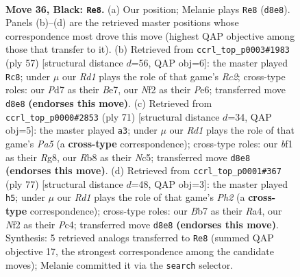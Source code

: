 \documentclass[11pt]{article}
\begin{document}
\clearpage

\begin{figure}[p]\centering
\begin{subfigure}{0.46\textwidth}\centering
\resizebox{\linewidth}{!}{%
\newchessgame
\chessboard[
  setfen={1r1r4/pb1p1pk1/8/4R1P1/8/8/PPK2n2/2B2BR1 b - - 0 36},
  showmover=false,
  pgfstyle=straightmove, color=movearrow, markmove={d8-e8}
]}
\caption{}
\end{subfigure}\hfill
\begin{subfigure}{0.46\textwidth}\centering
\resizebox{\linewidth}{!}{%
\newchessgame
\chessboard[
  setfen={8/r1r1bpk1/4p3/p4p2/P7/1R1BPP2/5PKP/3R4 b - - 1 29},
  showmover=false,
  pgfstyle=straightmove, color=movearrow, markmove={c7-c8}
]}
\caption{}
\end{subfigure}
\\[4pt]
\begin{subfigure}{0.46\textwidth}\centering
\resizebox{\linewidth}{!}{%
\newchessgame
\chessboard[
  setfen={6r1/2k2pr1/1p6/2n1P3/p1P2P1R/8/5KP1/4RB2 b - - 5 36},
  showmover=false,
  pgfstyle=straightmove, color=movearrow, markmove={a4-a3}
]}
\caption{}
\end{subfigure}\hfill
\begin{subfigure}{0.46\textwidth}\centering
\resizebox{\linewidth}{!}{%
\newchessgame
\chessboard[
  setfen={8/2r1k2p/p4p2/8/r1p1P1bP/4R3/6P1/1R2B1K1 b - - 1 39},
  showmover=false,
  pgfstyle=straightmove, color=movearrow, markmove={h7-h5}
]}
\caption{}
\end{subfigure}
\caption{\textbf{Move 36, Black: \texttt{Re8}.} (a) Our position; Melanie plays \texttt{Re8} (\texttt{d8e8}). Panels (b)--(d) are the retrieved master positions whose correspondence most drove this move (highest QAP objective among those that transfer to it). (b) Retrieved from \texttt{ccrl\_top\_p0003\#1983} (ply 57) [structural distance $d$=56, QAP obj=6]: the master played \texttt{Rc8}; under $\mu$ our \emph{Rd1} plays the role of that game's \emph{Rc2}; cross-type roles: our \emph{P}d7 as their \emph{B}e7, our \emph{N}f2 as their \emph{P}e6; transferred move \texttt{d8e8} \textbf{(endorses this move)}. (c) Retrieved from \texttt{ccrl\_top\_p0000\#2853} (ply 71) [structural distance $d$=34, QAP obj=5]: the master played \texttt{a3}; under $\mu$ our \emph{Rd1} plays the role of that game's \emph{Pa5} (a \textbf{cross-type} correspondence); cross-type roles: our \emph{b}f1 as their \emph{R}g8, our \emph{R}b8 as their \emph{N}c5; transferred move \texttt{d8e8} \textbf{(endorses this move)}. (d) Retrieved from \texttt{ccrl\_top\_p0001\#367} (ply 77) [structural distance $d$=48, QAP obj=3]: the master played \texttt{h5}; under $\mu$ our \emph{Rd1} plays the role of that game's \emph{Ph2} (a \textbf{cross-type} correspondence); cross-type roles: our \emph{B}b7 as their \emph{R}a4, our \emph{N}f2 as their \emph{P}c4; transferred move \texttt{d8e8} \textbf{(endorses this move)}. Synthesis: 5 retrieved analogs transferred to \texttt{Re8} (summed QAP objective 17, the strongest correspondence among the candidate moves); Melanie committed it via the \texttt{search} selector.}
\label{fig:thought-m71}
\end{figure}
\end{document}
